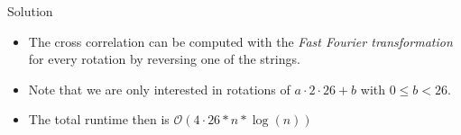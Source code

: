 \begin{slide}
	\begin{block}{Solution}
		\begin{itemize}
			\item The cross correlation can be computed with the \emph{Fast Fourier transformation} for every rotation by reversing one of the strings.
			\item Note that we are only interested in rotations of $a\cdot2\cdot26+b$ with $0\leq b<26$.
			\item The total runtime then is $\mathcal{O}(4\cdot26*n*\log(n))$
		\end{itemize}
	\end{block}
\end{slide}
